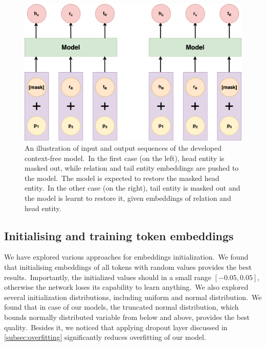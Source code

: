 \documentclass[longabstract, english, mgr]{iithesis}
\theoremstyle{default_theorem_style}\newtheorem{theorem}{Theorem}
\theoremstyle{default_theorem_style}\newtheorem{definition}{Definition}
\begin{document}
\begin{figure}[t]
\centering
\includegraphics[scale=0.25]{context_free_model}
\caption{An illustration of input and output sequences of the developed context-free model.\ In the first case
(on the left), head entity is masked out, while relation and tail entity embeddings are pushed to the model.\ The model
is expected to restore the masked head entity.\ In the other case (on the right), tail entity is masked out and the
model is learnt to restore it, given embeddings of relation and head entity.}
\label{fig:context_free_model}
\end{figure}

\subsection{Initialising and training token embeddings}\label{subsec:token_embeddings}

We have explored various approaches for embeddings initialization.\ We found that initialising embeddings of
all tokens with random values provides the best results.\ Importantly, the initialized values should in a small range
$[-0.05, 0.05]$, otherwise the network loses its capability to learn anything.\ We also explored several
initialization distributions, including uniform and normal distribution.\ We found that in case of our models, the
truncated normal distribution, which bounds normally distributed variable from below and above, provides the best
quality.\ Besides it, we noticed that applying dropout layer discussed in \ref{subsec:overfitting} significantly
reduces overfitting of our model.\newline
\end{document}
